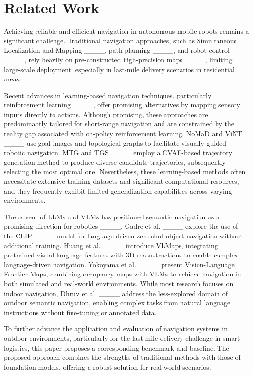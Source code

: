 \section{Related Work}
Achieving reliable and efficient navigation in autonomous mobile robots remains a significant challenge. Traditional navigation approaches, such as Simultaneous Localization and Mapping ____, path planning ____, and robot control ____, rely heavily on pre-constructed high-precision maps ____, limiting large-scale deployment, especially in last-mile delivery scenarios in residential areas.

Recent advances in learning-based navigation techniques, particularly reinforcement learning ____, offer promising alternatives by mapping sensory inputs directly to actions. Although promising, these approaches are predominantly tailored for short-range navigation and are constrained by the reality gap associated with on-policy reinforcement learning. NoMaD and ViNT ____ use goal images and topological graphs to facilitate visually guided robotic navigation. MTG and TGS ____ employ a CVAE-based trajectory generation method to produce diverse candidate trajectories, subsequently selecting the most optimal one. Nevertheless, these learning-based methods often necessitate extensive training datasets and significant computational resources, and they frequently exhibit limited generalization capabilities across varying environments.

The advent of LLMs and VLMs has positioned semantic navigation as a promising direction for robotics ____. Gadre et al. ____ explore the use of the CLIP ____ model for language-driven zero-shot object navigation without additional training. Huang et al. ____ introduce VLMaps, integrating pretrained visual-language features with 3D reconstructions to enable complex language-driven navigation. Yokoyama et al. ____ present Vision-Language Frontier Maps, combining occupancy maps with VLMs to achieve navigation in both simulated and real-world environments. While most research focuses on indoor navigation, Dhruv et al. ____ address the less-explored domain of outdoor semantic navigation, enabling complex tasks from natural language instructions without fine-tuning or annotated data.

To further advance the application and evaluation of navigation systems in outdoor environments, particularly for the last-mile delivery challenge in smart logistics, this paper proposes a corresponding benchmark and baseline. The proposed approach combines the strengths of traditional methods with those of foundation models, offering a robust solution for real-world scenarios.
